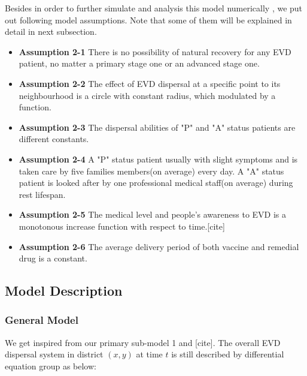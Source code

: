 Besides in order to further simulate and analysis this model numerically , we put out following model assumptions. Note that some of them will be explained in detail in next subsection.
\begin{itemize}
\item \textbf{Assumption 2-1} There is no possibility of natural recovery for any EVD patient, no matter a primary stage one or an advanced stage one.
\item \textbf{Assumption 2-2} The effect of EVD dispersal at a specific point to its neighbourhood is a circle with constant radius, which modulated by a function. 
\item \textbf{Assumption 2-3} The dispersal abilities of "P" and "A" status patients are different constants.
\item \textbf{Assumption 2-4} A "P" status patient usually with slight symptoms and is taken care by five families members(on average) every day. A "A" status patient is looked after by one professional medical staff(on average) during rest lifespan.
\item \textbf{Assumption 2-5} The medical level and people's awareness to EVD is a monotonous increase function with respect to time.[cite]
\item \textbf{Assumption 2-6} The average delivery period of both vaccine and remedial drug is a constant.
\end{itemize} 

\subsection{Model Description}
\subsubsection{General Model}
We get inspired from our primary sub-model 1 and [cite]. The overall EVD dispersal system in district $(x,y)$ at time $t$ is still described by differential equation group as below:

